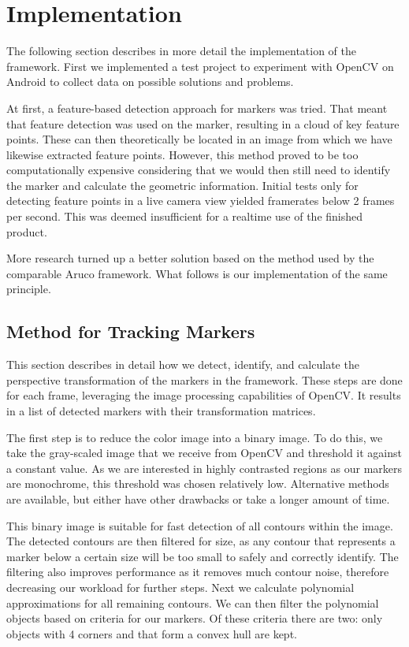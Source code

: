 \section{Implementation}

The following section describes in more detail the implementation of the framework.
First we implemented a test project to experiment with OpenCV on Android to collect data on possible solutions and problems.

At first, a feature-based detection approach for markers was tried.
That meant that feature detection was used on the marker, resulting in a cloud of key feature points.
These can then theoretically be located in an image from which we have likewise extracted feature points.
However, this method proved to be too computationally expensive considering that we would then still need to identify the marker and calculate the geometric information.
Initial tests only for detecting feature points in a live camera view yielded framerates below 2 frames per second.
This was deemed insufficient for a realtime use of the finished product.

More research turned up a better solution based on the method used by the comparable Aruco\cite{aruco} framework.
What follows is our implementation of the same principle.

\subsection{Method for Tracking Markers}

This section describes in detail how we detect, identify, and calculate the perspective transformation of the markers in the framework.
These steps are done for each frame, leveraging the image processing capabilities of OpenCV.
It results in a list of detected markers with their transformation matrices.

The first step is to reduce the color image into a binary image.
To do this, we take the gray-scaled image that we receive from OpenCV and threshold it against a constant value.
As we are interested in highly contrasted regions as our markers are monochrome, this threshold was chosen relatively low.
Alternative methods are available, but either have other drawbacks or take a longer amount of time.

This binary image is suitable for fast detection of all contours within the image.
The detected contours are then filtered for size, as any contour that represents a marker below a certain size will be too small to safely and correctly identify.
The filtering also improves performance as it removes much contour noise, therefore decreasing our workload for further steps.
Next we calculate polynomial approximations for all remaining contours.
We can then filter the polynomial objects based on criteria for our markers.
Of these criteria there are two: only objects with 4 corners and that form a convex hull are kept.

